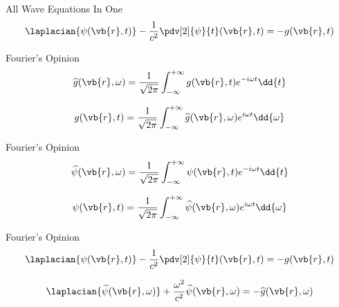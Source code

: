     \begin{frame}{All Wave Equations In One}
        \begin{equation*}
            \laplacian{\psi(\vb{r},t)} - \frac{1}{c^2}\pdv[2]{\psi}{t} (\vb{r},t) = - g(\vb{r},t)
        \end{equation*}
    \end{frame}
    
    \begin{frame}{Fourier's Opinion}
        \begin{equation*}
            \widehat{g}(\vb{r},\omega) = \frac{1}{\sqrt{2\pi}} \int_{-\infty}^{+\infty} g(\vb{r},t) e^{-i\omega t} \dd{t}
        \end{equation*}
        
        \begin{equation*}
            g(\vb{r},t) = \frac{1}{\sqrt{2\pi}} \int_{-\infty}^{+\infty} \widehat{g}(\vb{r},\omega) e^{i\omega t} \dd{\omega}
        \end{equation*}
    \end{frame}
    
    \begin{frame}{Fourier's Opinion}
        \begin{equation*}
            \widehat{\psi}(\vb{r},\omega) = \frac{1}{\sqrt{2\pi}} \int_{-\infty}^{+\infty} \psi(\vb{r},t) e^{-i\omega t} \dd{t}
        \end{equation*}
        
        \begin{equation*}
            \psi(\vb{r},t) = \frac{1}{\sqrt{2\pi}} \int_{-\infty}^{+\infty} \widehat{\psi}(\vb{r},\omega) e^{i\omega t} \dd{\omega}
        \end{equation*}
    \end{frame}
    
    \begin{frame}{Fourier's Opinion}
        \begin{equation*}
            \laplacian{\psi(\vb{r},t)} - \frac{1}{c^2}\pdv[2]{\psi}{t} (\vb{r},t) = - g(\vb{r},t)
        \end{equation*}
        
        \begin{equation*}
            \laplacian{\widehat{\psi}(\vb{r},\omega)} + \frac{\omega^2}{c^2} \widehat{\psi}(\vb{r},\omega) = - \widehat{g}(\vb{r},\omega)
        \end{equation*}
    \end{frame}
    
